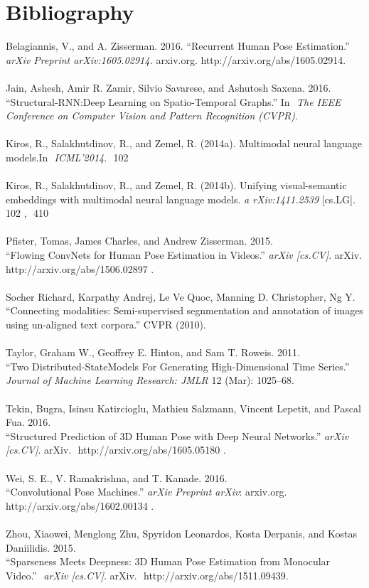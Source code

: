 \documentclass[a4paper, 12pt]{article}
\newcommand\tab[1][1cm]{\hspace*{#1}}
\begin{document}
\section{Bibliography}

Belagiannis, V., and A. Zisserman. 2016. “Recurrent Human Pose Estimation.” \\
\tab \textit{arXiv Preprint arXiv:1605.02914.} arxiv.org. ​
http://arxiv.org/abs/1605.02914. \\ \\ Jain, Ashesh, Amir R. Zamir, Silvio
Savarese, and Ashutosh Saxena. 2016. \\ \tab “Structural-RNN:Deep Learning on
Spatio-Temporal Graphs.” In ​ \textit{The IEEE Conference on Computer Vision and
Pattern Recognition (CVPR)}. \\ \\ Kiros, R., Salakhutdinov, R., and Zemel, R.
(2014a). Multimodal neural language models.In ​ \textit{ICML’2014}. ​ 102 \\ \\
Kiros, R., Salakhutdinov, R., and Zemel, R. (2014b). Unifying visual-semantic
embeddings with multimodal neural language models. \textit{a rXiv:1411.2539}
[cs.LG]. 102​ , ​ 410 \\ \\ Pfister, Tomas, James Charles, and Andrew Zisserman.
2015. \\ \tab “Flowing ConvNets for Human Pose Estimation in Videos.”
\textit{arXiv [cs.CV]}. arXiv. http://arxiv.org/abs/1506.02897​ . \\ \\ Socher
Richard, Karpathy Andrej, Le Ve Quoc, Manning D. Christopher, Ng Y. \\ \tab
“Connecting modalities: Semi-supervised segnmentation and annotation of images
using un-aligned text corpora.” CVPR (2010). \\ \\ Taylor, Graham W., Geoffrey
E. Hinton, and Sam T. Roweis. 2011. \\ \tab “Two Distributed-StateModels For
Generating High-Dimensional Time Series.” \textit{Journal of Machine Learning
Research: JMLR} 12 (Mar): 1025–68. \\ \\ Tekin, Bugra, Isinsu Katircioglu,
Mathieu Salzmann, Vincent Lepetit, and Pascal Fua. 2016. \\ \tab “Structured
Prediction of 3D Human Pose with Deep Neural Networks.” ​\textit{ arXiv
[cs.CV]}. arXiv. ​ http://arxiv.org/abs/1605.05180​ . \\ \\ Wei, S. E., V.
Ramakrishna, and T. Kanade. 2016. \\ \tab “Convolutional Pose Machines.”
\textit{ arXiv Preprint arXiv}: arxiv.org. http://arxiv.org/abs/1602.00134​ . \\ \\
Zhou, Xiaowei, Menglong Zhu, Spyridon Leonardos, Kosta Derpanis, and Kostas
Daniilidis. 2015. \\ \tab “Sparseness Meets Deepness: 3D Human Pose Estimation
from Monocular Video.” ​ \textit{arXiv [cs.CV]}. arXiv. ​
http://arxiv.org/abs/1511.09439​ .
\end{document}
